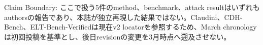 \begin{claimboundary}
Claim Boundary: ここで扱う5件のmethod、benchmark、attack resultはいずれもauthorsの報告であり、本誌が独立再現した結果ではない。Claudini、CDH-Bench、ELT-Bench-Verifiedは現在v2 locatorを参照するため、March chronologyは初回投稿を基準とし、後日revisionの変更を3月時点へ遡及させない。\autocite{src-198727200361,src-4553a7bbd23e,src-5d84874f2d03,src-a27679e5527b,src-bb83c9c55568}
\end{claimboundary}
